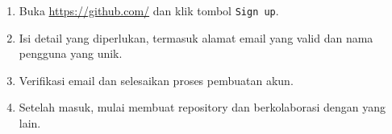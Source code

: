 \begin{enumerate}
	\item Buka \url{https://github.com/} dan klik tombol \texttt{Sign up}.
	\item Isi detail yang diperlukan, termasuk alamat email yang valid dan nama pengguna yang unik.
	\item Verifikasi email dan selesaikan proses pembuatan akun.
	\item Setelah masuk, mulai membuat repository dan berkolaborasi dengan yang lain.
\end{enumerate}

